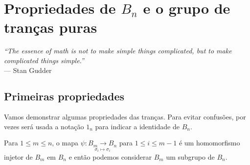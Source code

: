 \chapter[Propriedades de \texorpdfstring{$B_n$}{Bn} e o grupo de tranças puras]{Propriedades de \texorpdfstring{$B_n$}{Bn} e o grupo de tranças puras}
\label{cap-4}
\chaptermark{}
%
\hfill%
\begin{minipage}{10cm}
\begin{flushright}
\rightskip=0.5cm
\textit{``The essence of math is not to make simple things complicated, but to make complicated things simple.''}
\\[0.1cm]
\rightskip=0.5cm
--- Stan Gudder
\end{flushright}
\end{minipage}

\section{Primeiras propriedades}

    Vamos demonstrar algumas propriedades das tranças. Para evitar confusões, por vezes será usada a notação $1_n$ para indicar a identidade de $B_n$.
	
	
	
	
	
	\begin{prop}
		\label{B_m subgrupo de B_n}
		Para $1\leq m\leq n$, o mapa $\psi: \underset{\sigma_i\mapsto\sigma_i}{B_m\to B_n}$ para $1\leq i\leq m-1$ é um homomorfismo injetor de $B_m$ em $B_n$ e então podemos considerar $B_m$ um subgrupo de $B_n$. 
	\end{prop}
	
